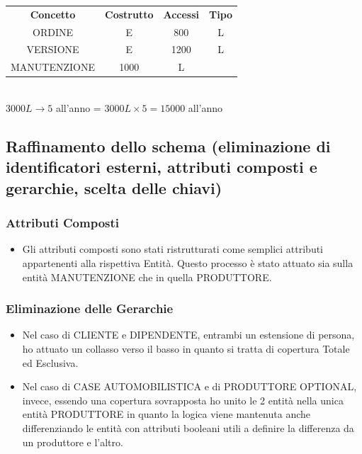 \documentclass[12pt]{article}
\begin{document}
\begin{table}[H]
    \centering
    \begin{tabular}{c c c c}
        \rowcolor{red!20!}
        \textbf{Concetto} & \textbf{Costrutto} & \textbf{Accessi} &
        \textbf{Tipo}\\
        ORDINE & E & 800 & L \\
        VERSIONE & E & 1200 & L \\
        MANUTENZIONE & 1000 & L \\
    \end{tabular}\\
    \( 3000L \rightarrow 5 \) all'anno = \( 3000L \times 5 = 15000 \) all'anno
\end{table}

\subsection{Raffinamento dello schema (eliminazione di identificatori esterni,
attributi composti e gerarchie, scelta delle chiavi)}

\subsubsection{Attributi Composti}
\begin{itemize}
    \item Gli attributi composti sono stati ristrutturati come semplici
    attributi appartenenti alla rispettiva Entità. Questo processo è stato
    attuato sia sulla entità MANUTENZIONE che in quella PRODUTTORE.
\end{itemize}

\subsubsection{Eliminazione delle Gerarchie}

\begin{itemize}
    \item Nel caso di CLIENTE e DIPENDENTE, entrambi un estensione di persona,
    ho attuato un collasso verso il basso in quanto si tratta di copertura
    Totale ed Esclusiva.
    \item Nel caso di CASE AUTOMOBILISTICA e di PRODUTTORE OPTIONAL, invece,
    essendo una copertura sovrapposta ho unito le 2 entità nella unica entità
    PRODUTTORE in quanto la logica viene mantenuta anche differenziando le
    entità con attributi booleani utili a definire la differenza da un produttore e
    l'altro.
\end{itemize}
\end{document}
